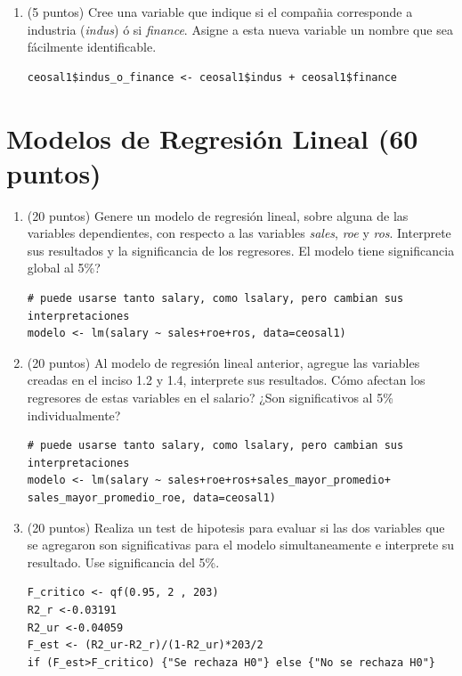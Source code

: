 \documentclass[letterpaper,11pt]{article}
\begin{document}
\begin{enumerate}
    \item (5 puntos) Cree una variable que indique si el compañia corresponde a industria (\textit{indus}) ó si \textit{finance}.  Asigne a esta nueva variable un nombre que sea fácilmente identificable.

\begin{lstlisting}
ceosal1$indus_o_finance <- ceosal1$indus + ceosal1$finance
\end{lstlisting} 

\end{enumerate}

\section{Modelos de Regresión Lineal (60 puntos)}

\begin{enumerate}

    \item (20 puntos) Genere un modelo de regresión lineal, sobre alguna de las variables dependientes, con respecto a las variables \textit{sales}, \textit{roe} y \textit{ros}. Interprete sus resultados y la significancia de los regresores. \textquestiondown El modelo tiene significancia global al 5\%?

\begin{lstlisting}
# puede usarse tanto salary, como lsalary, pero cambian sus interpretaciones
modelo <- lm(salary ~ sales+roe+ros, data=ceosal1)
\end{lstlisting}

\item (20 puntos) Al modelo de regresión lineal anterior, agregue las variables creadas en el inciso 1.2 y 1.4, interprete sus resultados. \textquestiondown Cómo afectan los regresores de estas variables en el salario? ¿Son significativos al 5\% individualmente?

\begin{lstlisting}
# puede usarse tanto salary, como lsalary, pero cambian sus interpretaciones
modelo <- lm(salary ~ sales+roe+ros+sales_mayor_promedio+ sales_mayor_promedio_roe, data=ceosal1)
\end{lstlisting}

\item (20 puntos) Realiza un test de hipotesis para evaluar si las dos variables que se agregaron son significativas para el modelo simultaneamente e interprete su resultado. Use significancia del 5\%.
\begin{lstlisting}
F_critico <- qf(0.95, 2 , 203)
R2_r <-0.03191
R2_ur <-0.04059
F_est <- (R2_ur-R2_r)/(1-R2_ur)*203/2
if (F_est>F_critico) {"Se rechaza H0"} else {"No se rechaza H0"}
\end{lstlisting}


\end{enumerate}
\end{document}
